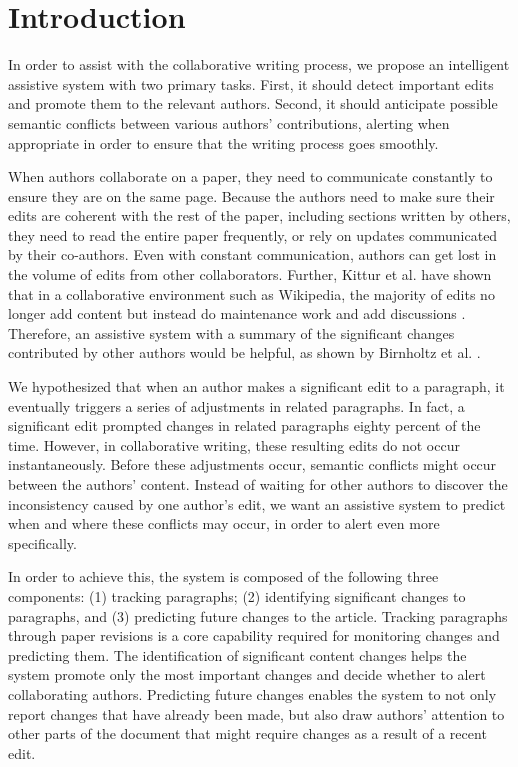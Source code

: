 \section{Introduction}\label{introduction}

In order to assist with the collaborative writing process, we propose an
intelligent assistive system with two primary tasks. First, it should
detect important edits and promote them to the relevant authors. Second,
it should anticipate possible semantic conflicts between various
authors' contributions, alerting when appropriate in order to ensure
that the writing process goes smoothly.

When authors collaborate on a paper, they need to communicate constantly
to ensure they are on the same page. Because the authors need to make
sure their edits are coherent with the rest of the paper, including
sections written by others, they need to read the entire paper
frequently, or rely on updates communicated by their co-authors. Even
with constant communication, authors can get lost in the volume of edits
from other collaborators. Further, Kittur et al. have shown that in a
collaborative environment such as Wikipedia, the majority of edits no
longer add content but instead do maintenance work and add discussions
\cite{kittur2007he}. Therefore, an assistive system with a summary of
the significant changes contributed by other authors would be helpful,
as shown by Birnholtz et al. \cite{birnholtz2012tracking}.

We hypothesized that when an author makes a significant edit to a
paragraph, it eventually triggers a series of adjustments in related
paragraphs. In fact, a significant edit prompted changes in related
paragraphs eighty percent of the time. However, in collaborative
writing, these resulting edits do not occur instantaneously. Before
these adjustments occur, semantic conflicts might occur between the
authors' content. Instead of waiting for other authors to discover the
inconsistency caused by one author's edit, we want an assistive system
to predict when and where these conflicts may occur, in order to alert
even more specifically.

In order to achieve this, the system is composed of the following three
components: (1) tracking paragraphs; (2) identifying significant changes
to paragraphs, and (3) predicting future changes to the article.
Tracking paragraphs through paper revisions is a core capability
required for monitoring changes and predicting them. The identification
of significant content changes helps the system promote only the most
important changes and decide whether to alert collaborating authors.
Predicting future changes enables the system to not only report changes
that have already been made, but also draw authors' attention to other
parts of the document that might require changes as a result of a recent
edit.

